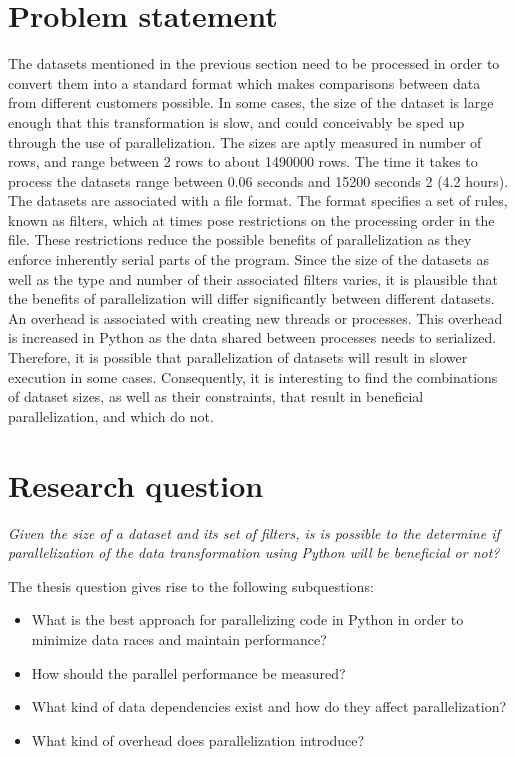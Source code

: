 \section{Problem statement}
The datasets mentioned in the previous section need to be processed in order to convert them into a standard format
which makes comparisons between data from different customers possible. 
In some cases, the size of the dataset is large enough that this transformation is slow, and could conceivably be sped up through
the use of parallelization.  The sizes are aptly measured in number of rows, and range between 2 rows to about 1490000 rows. The time
it takes to process the datasets range between 0.06 seconds and 15200 seconds 2 (4.2 hours).
The datasets are associated with a file format. The format specifies a set of rules, known as filters, which at times pose restrictions on the processing order in the file.  These restrictions reduce the possible benefits of parallelization as they enforce inherently serial parts of the program. Since the size of the datasets as
well as the type and number of their associated filters varies, it is plausible that the benefits of parallelization will differ significantly between
different datasets. An overhead is associated with creating new threads or processes. This overhead is increased in Python as the data shared
between processes needs to serialized. Therefore, it is possible that parallelization of datasets will result in slower execution in some cases.
Consequently, it is interesting to find the combinations of dataset sizes, as well as their constraints, that result in beneficial parallelization,
and which do not.

\section{Research question}
\emph{Given the size of a dataset and its set of filters, is is possible to the determine 
if parallelization of the data transformation using Python will be beneficial or not?}

The thesis question gives rise to the following subquestions:
\begin{itemize}
    \item What is the best approach for parallelizing code in Python in order to minimize data races and maintain performance?
    \item How should the parallel performance be measured?
    \item What kind of data dependencies exist and how do they affect parallelization?
    \item What kind of overhead does parallelization introduce?
\end{itemize}

